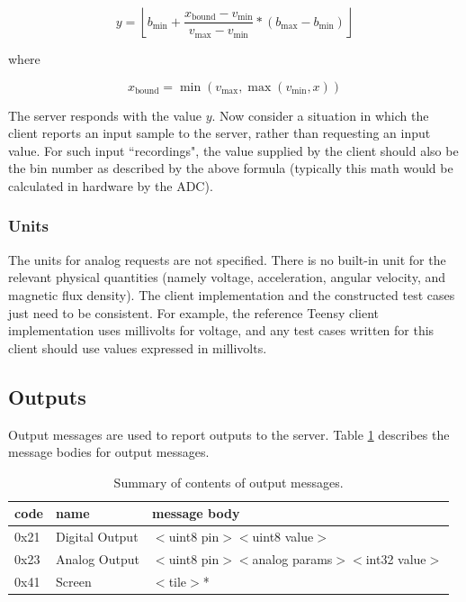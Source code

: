 \documentclass[12pt]{article}
\begin{document}
\begin{appendices}
$$y = \left \lfloor b_{\text{min}} + \frac{x_{\text{bound}}-v_{\text{min}}}{v_{\text{max}}-v_{\text{min}}} * (b_{\text{max}}-b_{\text{min}}) \right \rfloor$$

where

$$x_{\text{bound}} = \min(v_{\text{max}}, \max(v_{\text{min}}, x))$$

The server responds with the value $y$.  Now consider a situation in which the client reports an input sample to the server, rather than requesting an input value.  For such input ``recordings", the value supplied by the client should also be the bin number as described by the above formula (typically this math would be calculated in hardware by the ADC).

\subsubsection{Units}
The units for analog requests are not specified.  There is no built-in unit for the relevant physical quantities (namely voltage, acceleration, angular velocity, and magnetic flux density).  The client implementation and the constructed test cases just need to be consistent.  For example, the reference Teensy client implementation uses millivolts for voltage, and any test cases written for this client should use values expressed in millivolts.

\subsection{Outputs}
Output messages are used to report outputs to the server.  Table \ref{table:output-messages} describes the message bodies for output messages.

\begin{table}[ht]
\begin{center}
\begin{tabular}{l l l}
code & name & message body \\ \hline
0x21 & Digital Output & $<$uint8 pin$>$$<$uint8 value$>$ \\
0x23 & Analog Output & $<$uint8 pin$>$$<$analog params$>$$<$int32 value$>$ \\
0x41 & Screen & $<$tile$>$* \\
\end{tabular}
\caption{Summary of contents of output messages.}
\label{table:output-messages}
\end{center}
\end{table}


\end{appendices}
\end{document}
